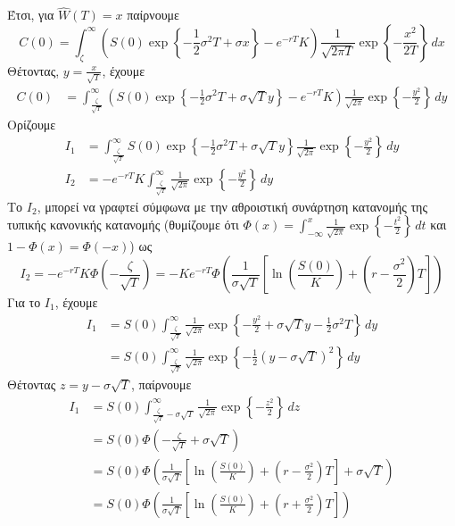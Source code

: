 \documentclass[12pt,a4paper,twoside,openany]{book}
\begin{document}
 	Έτσι, για $\widehat{W}(T)=x$ παίρνουμε
 	\[
 		C(0) = \int_{\zeta}^{\infty} \left(S(0)\exp\left\{ -\frac{1}{2}\sigma^2 T +\sigma x\right\} - e^{-rT}K \right) \frac{1}{\sqrt{2\pi T}} \exp\left\{-\frac{x^2}{2T} \right\} \,dx 
 	\]
 	Θέτοντας, $y=\frac{x}{\sqrt{T}}$, έχουμε
 	\begin{align*}
 		C(0) &= \int_{\frac{\zeta}{\sqrt{T}}}^{\infty} \left(S(0)\exp\left\{ -\frac{1}{2}\sigma^2 T +\sigma\sqrt{T}y \right\} - e^{-rT}K  \right) 			  \frac{1}{\sqrt{2\pi}} \exp\left\{-\frac{y^2}{2} \right\} \,dy 
 	\end{align*}
 	Ορίζουμε 
 	\begin{align*}
 		I_1 &= \int_{\frac{\zeta}{\sqrt{T}}}^{\infty} S(0)\exp\left\{ -\frac{1}{2}\sigma^2 T + \sigma\sqrt{T}y \right\} \frac{1}{\sqrt{2\pi}} \exp\left\{-\frac{y^2}{2}  \right\} \,dy \\
 		I_2 &= -e^{-rT}K \int_{\frac{\zeta}{\sqrt{T}}}^{\infty} \frac{1}{\sqrt{2\pi}} \exp\left\{-\frac{y^2}{2} \right\} \,dy
 	\end{align*}
 	Το $I_2$, μπορεί να γραφτεί σύμφωνα με την αθροιστική συνάρτηση κατανομής της τυπικής κανονικής κατανομής (θυμίζουμε ότι $\Phi(x)=\int_{-\infty}^{x} \frac{1}{\sqrt{2\pi}} \exp\left\{-\frac{t^2}{2} \right\}\, dt $ και $1-\Phi(x)=\Phi(-x)$)
 	ως 
 	\[I_2= -e^{-rT}K \Phi\left(-\frac{\zeta}{\sqrt{T}}\right)= -Ke^{-rT}\Phi\left(\frac{1}{\sigma\sqrt{T}} \left[\ln(\frac{S(0)}{K}) + \left(r-\frac{\sigma^2}{2}\right)T \right] \right)  \]
 	Για το $I_1$, έχουμε
 	\begin{align*}
 		I_1 &= S(0)\int_{\frac{\zeta}{\sqrt{T}}}^{\infty} \frac{1}{\sqrt{2\pi}} \exp\left\{ -\frac{y^2}{2} + \sigma\sqrt{T}y -\frac{1}{2}\sigma^2 T  \right\}  \,dy  \\
 			&= S(0)\int_{\frac{\zeta}{\sqrt{T}}}^{\infty} \frac{1}{\sqrt{2\pi}} \exp\left\{-\frac{1}{2}(y-\sigma\sqrt{T})^2  \right\}  \,dy
 	\end{align*}
 	Θέτοντας $z= y-\sigma\sqrt{T}$, παίρνουμε
 	\begin{align*}
 		I_1 &= S(0)\int_{\frac{\zeta}{\sqrt{T}} - \sigma\sqrt{T}}^{\infty} \frac{1}{\sqrt{2\pi}} \exp\left\{-\frac{z^2}{2}  \right\}  \,dz \\
 			&= S(0) \Phi\left(-\frac{\zeta}{\sqrt{T}} + \sigma\sqrt{T}\right) \\
 			&= S(0) \Phi\left(\frac{1}{\sigma\sqrt{T}} \left[\ln(\frac{S(0)}{K}) + \left(r-\frac{\sigma^2}{2}\right)T \right] + \sigma\sqrt{T} \right) \\
 			&= S(0) \Phi\left(\frac{1}{\sigma\sqrt{T}} \left[\ln(\frac{S(0)}{K}) + \left(r+\frac{\sigma^2}{2}\right)T \right]\right)
 	\end{align*}
\end{document}
